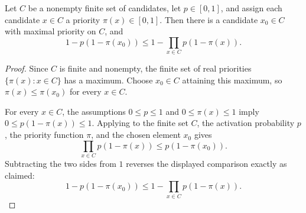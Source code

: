 \begin{helper}
Let $C$ be a nonempty finite set of candidates, let $p\in[0,1]$, and assign
each candidate $x\in C$ a priority $\pi(x)\in[0,1]$.  Then there is a
candidate $x_0\in C$ with maximal priority on $C$, and
\[
1-p(1-\pi(x_0))
\le
1-\prod_{x\in C} p(1-\pi(x)).
\]
\end{helper}
\begin{proof}
Since $C$ is finite and nonempty, the finite set of real priorities
$\{\pi(x):x\in C\}$ has a maximum.  Choose $x_0\in C$ attaining this maximum,
so $\pi(x)\le \pi(x_0)$ for every $x\in C$.

For every $x\in C$, the assumptions $0\le p\le1$ and
$0\le \pi(x)\le1$ imply $0\le p(1-\pi(x))\le1$.  Applying
 to the finite set $C$, the
activation probability $p$, the priority function $\pi$, and the chosen
element $x_0$ gives
\[
\prod_{x\in C}p(1-\pi(x))\le p(1-\pi(x_0)).
\]
Subtracting the two sides from $1$ reverses the displayed comparison exactly
as claimed:
\[
1-p(1-\pi(x_0))
\le
1-\prod_{x\in C}p(1-\pi(x)).
\]
\end{proof}
